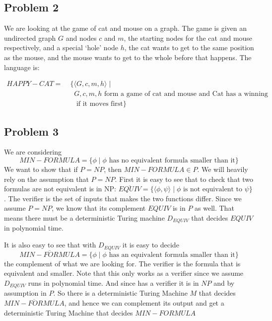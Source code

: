 \documentclass[english]{article}
\begin{document}
\subsection*{Problem 2}
We are looking at the game of cat and mouse on a graph. The game is given an undirected graph $G$ and nodes $c$ and
$m$, the starting nodes for the cat and mouse respectively, and a special `hole' node $h$, the cat wants to get to
the same position as the mouse, and the mouse wants to get to the whole before that happens. The language is:

\begin{align*}
HAPPY-CAT =&\; \{ \langle G,c,m,h \rangle \mid \\
          &\;\;\; G,c,m,h \textrm{ form a game of cat and mouse and Cat has a winning strategy} \\
          &\;\;\;    \textrm{ if it moves first} \}
\end{align*}



\subsection*{Problem 3}
We are considering 
\[ MIN-FORMULA = \{ \phi \mid \phi \textrm{ has no equivalent formula smaller than it}\} \]
We want to show that if $P = NP$, then $MIN-FORMULA \in P$.
We will heavily rely on the assumption that $P = NP$. First it is easy to see that to check that two formulas are
not equivalent is in NP: $\overline{EQUIV} =
\{ \langle \phi, \psi \rangle \mid \phi \textrm{ is not equivalent to }\psi \}$. The verifier is the set of inputs
that makes the two functions differ. Since we assume $P = NP$, we know that its complement $EQUIV$ is in $P$ as well. 
That means there must be a deterministic Turing machine $D_{EQUIV}$ that decides $EQUIV$ in polynomial time.

It is also easy to see that with $D_{EQUIV}$ it is easy to decide
\[ \overline{MIN-FORMULA} = \{ \phi \mid \phi \textrm{ has an equivalent formula smaller than it}\} \]
the complement
of what we are looking for. The verifier is the formula that is equivalent and smaller. Note that this only works as
a verifier since we assume $D_{EQUIV}$ runs in polynomial time. And since has a verifier it is in $NP$ and by 
assumption in $P$. So there is a deterministic Turing Machine $M$ that decides $\overline{MIN-FORMULA}$, and hence
we can complement its output and get a deterministic Turing Machine that decides ${MIN-FORMULA}$
\end{document}
